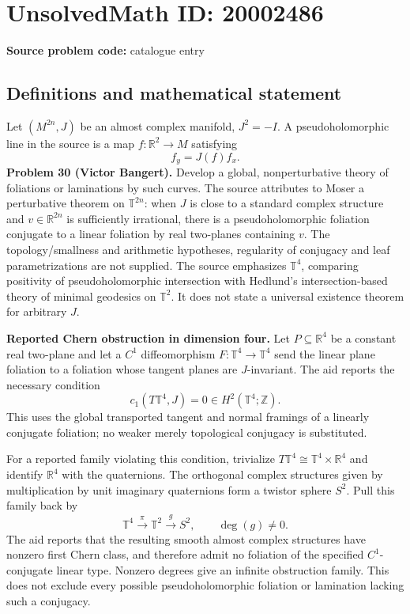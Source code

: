 \documentclass[11pt]{article}
\newcommand{\Z}{\mathbb{Z}}
\newcommand{\R}{\mathbb{R}}
\begin{document}
\section*{UnsolvedMath ID: 20002486}
\textbf{Source problem code:} catalogue entry
\subsection{Definitions and mathematical statement}
Let \((M^{2n},J)\) be an almost complex manifold, \(J^2=-I\). A pseudoholomorphic line in the source is a map \(f:\R^2\to M\) satisfying
\[
 f_y=J(f)f_x.
\]
\textbf{Problem 30 (Victor Bangert).} Develop a global, nonperturbative theory of foliations or laminations by such curves. The source attributes to Moser a perturbative theorem on \(\mathbb T^{2n}\): when \(J\) is close to a standard complex structure and \(v\in\R^{2n}\) is sufficiently irrational, there is a pseudoholomorphic foliation conjugate to a linear foliation by real two-planes containing \(v\). The topology/smallness and arithmetic hypotheses, regularity of conjugacy and leaf parametrizations are not supplied. The source emphasizes \(\mathbb T^4\), comparing positivity of pseudoholomorphic intersection with Hedlund's intersection-based theory of minimal geodesics on \(\mathbb T^2\). It does not state a universal existence theorem for arbitrary \(J\).

\textbf{Reported Chern obstruction in dimension four.} Let \(P\subseteq\R^4\) be a constant real two-plane and let a \(C^1\) diffeomorphism \(F:\mathbb T^4\to\mathbb T^4\) send the linear plane foliation to a foliation whose tangent planes are \(J\)-invariant. The aid reports the necessary condition
\[
 c_1(T\mathbb T^4,J)=0\in H^2(\mathbb T^4;\Z).
\]
This uses the global transported tangent and normal framings of a linearly conjugate foliation; no weaker merely topological conjugacy is substituted.

For a reported family violating this condition, trivialize \(T\mathbb T^4\cong\mathbb T^4\times\R^4\) and identify \(\R^4\) with the quaternions. The orthogonal complex structures given by multiplication by unit imaginary quaternions form a twistor sphere \(S^2\). Pull this family back by
\[
 \mathbb T^4\xrightarrow{\pi}\mathbb T^2\xrightarrow{g}S^2,
 \qquad\deg(g)\ne0.
\]
The aid reports that the resulting smooth almost complex structures have nonzero first Chern class, and therefore admit no foliation of the specified \(C^1\)-conjugate linear type. Nonzero degrees give an infinite obstruction family. This does not exclude every possible pseudoholomorphic foliation or lamination lacking such a conjugacy.
\end{document}
